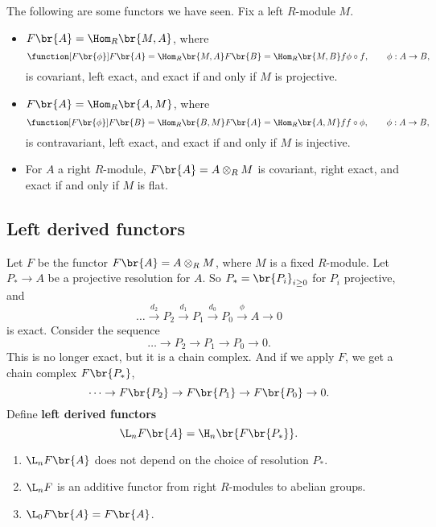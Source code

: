 \begin{example*}
The following are some functors we have seen. Fix a left $ R $-module $ M $.
\begin{itemize}
\item $ F\br{A} = \Hom_R\br{M, A} $, where
$$ \function[F\br{\phi}]{F\br{A} = \Hom_R\br{M, A}}{F\br{B} = \Hom_R\br{M, B}}{f}{\phi \circ f}, \qquad \phi : A \to B, $$
is covariant, left exact, and exact if and only if $ M $ is projective.
\item $ F\br{A} = \Hom_R\br{A, M} $, where
$$ \function[F\br{\phi}]{F\br{B} = \Hom_R\br{B, M}}{F\br{A} = \Hom_R\br{A, M}}{f}{f \circ \phi}, \qquad \phi : A \to B, $$
is contravariant, left exact, and exact if and only if $ M $ is injective.
\item For $ A $ a right $ R $-module, $ F\br{A} = A \otimes_R M $ is covariant, right exact, and exact if and only if $ M $ is flat.
\end{itemize}
\end{example*}

\pagebreak

\subsection{Left derived functors}

Let $ F $ be the functor $ F\br{A} = A \otimes_R M $, where $ M $ is a fixed $ R $-module. Let $ P_* \to A $ be a projective resolution for $ A $. So $ P_* = \br{P_i}_{i \ge 0} $ for $ P_i $ projective, and
$$ \dots \xrightarrow{d_2} P_2 \xrightarrow{d_1} P_1 \xrightarrow{d_0} P_0 \xrightarrow{\phi} A \to 0 $$
is exact. Consider the sequence
$$ \dots \to P_2 \to P_1 \to P_0 \to 0. $$
This is no longer exact, but it is a chain complex. And if we apply $ F $, we get a chain complex $ F\br{P_*} $,
$$ \dots \to F\br{P_2} \to F\br{P_1} \to F\br{P_0} \to 0. $$
Define \textbf{left derived functors}
$$ \L_nF\br{A} = \H_n\br{F\br{P_*}}. $$

\begin{theorem}
\hfill
\begin{enumerate}
\item $ \L_nF\br{A} $ does not depend on the choice of resolution $ P_* $.
\item $ \L_nF $ is an additive functor from right $ R $-modules to abelian groups.
\item $ \L_0F\br{A} = F\br{A} $.
\end{enumerate}
\end{theorem}

